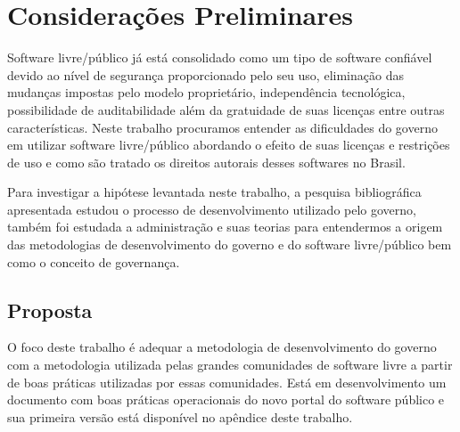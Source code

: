 \chapter{Considerações Preliminares}
\label{consideracoes}

Software livre/público já está consolidado como um tipo de software confiável 
devido ao nível de segurança proporcionado pelo seu uso, eliminação das mudanças
impostas pelo modelo proprietário, independência tecnológica, possibilidade de
auditabilidade além da gratuidade de suas licenças entre outras características.
%
Neste trabalho procuramos entender as dificuldades do governo em utilizar software
livre/público abordando o efeito de suas licenças e restrições de uso e como são 
tratado os direitos autorais desses softwares no Brasil.

Para investigar a hipótese levantada neste trabalho, a pesquisa bibliográfica 
apresentada estudou o processo de desenvolvimento utilizado pelo governo, também foi 
estudada a administração e suas teorias para entendermos a origem das metodologias
de desenvolvimento do governo e do software livre/público bem como o conceito de 
governança.

\section{Proposta}

O foco deste trabalho é adequar a metodologia de desenvolvimento do governo com a
metodologia utilizada pelas grandes comunidades de software livre a partir de boas 
práticas utilizadas por essas comunidades.
Está em desenvolvimento um documento com boas práticas operacionais do novo portal 
do software público e sua primeira versão está disponível no apêndice deste trabalho. 


